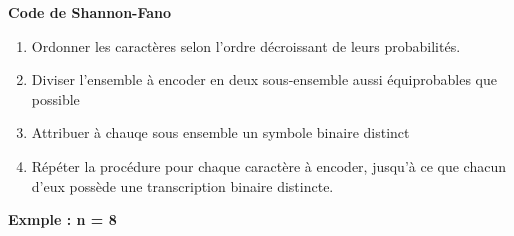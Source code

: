 \documentclass[12pt]{article}
\begin{document}
\textbf{Code de Shannon-Fano}
\begin{enumerate}
    \item Ordonner les caractères selon l'ordre décroissant de leurs probabilités.
    \item Diviser l'ensemble à encoder en deux sous-ensemble aussi équiprobables que possible
    \item Attribuer à chauqe sous ensemble un symbole binaire distinct
    \item Répéter la procédure pour chaque caractère à encoder, jusqu'à ce que chacun d'eux possède une transcription binaire distincte.
\end{enumerate}

\textbf{Exmple : n = 8}
\end{document}
